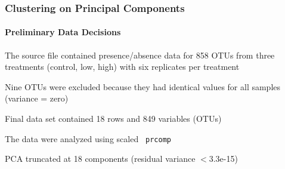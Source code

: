 \documentclass[10pt]{beamer}
\begin{document}
\begin{frame}[fragile]
\frametitle{Clustering on Principal Components}
\framesubtitle{Preliminary Data Decisions}

\bi
\item The source file contained presence/absence data for 858 OTUs
  from three treatments (control, low, high) with six replicates per
  treatment

\item Nine OTUs were excluded because they had identical values for
  all samples (variance = zero)

\item Final data set contained 18 rows and 849 variables (OTUs)

\item The data were analyzed using scaled {\color{red} \tt
    prcomp}

\item PCA truncated at 18 components (residual variance $<$3.3e-15)
  \ei
\end{frame}
\end{document}
